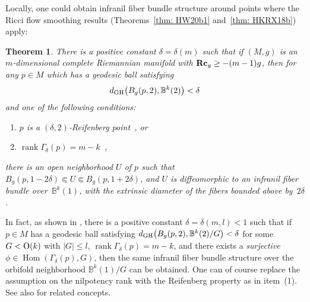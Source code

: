 \documentclass[pdftex]{sigma}
\numberwithin{equation}{section}
\newtheorem{Theorem}{Theorem}[section]
\newcommand{\Rc}{\operatorname{\bf Rc}}
\newcommand{\rank}{\operatorname{rank}}
\begin{document}
Locally, one could obtain infranil fiber bundle structure around points where
the Ricci flow smoothing results (Theorems~\ref{thm: HW20b1} and~\ref{thm: HKRX18b}) apply:
\begin{Theorem}\label{thm: local_infranil}
There is a positive constant $\delta=\delta(m)$ such that if $(M,g)$ is an
$m$-dimensional complete Riemannian manifold with $\Rc_g\ge -(m-1)g$, then for
any $p\in M$ which has a geodesic ball satisfying
\begin{align*}
d_{\rm GH}\big(B_g(p,2),\mathbb{B}^k(2)\big) < \delta
\end{align*}
and one of the following
conditions:
\begin{enumerate}\itemsep=0pt
 \item[$1)$] $p$ is a $(\delta,2)$-Reifenberg point~{\rm \cite{HKRX18}}, or
 \item[$2)$] $\rank \Gamma_{\delta}(p)=m-k$~{\rm \cite{HW20b}},
\end{enumerate}
there is an open neighborhood $U$ of $p$ such that $B_g(p,1-2\delta )\Subset
U\Subset B_g(p,1+2\delta)$, and $U$ is diffeomorphic to an infranil fiber
bundle over~$\mathbb{B}^k(1)$, with the extrinsic diameter of the fibers
bounded above by~$2\delta$.
\end{Theorem}
\begin{Remark}\label{rmk: orbifold_fibration}
In fact, as shown in \cite[Theorem~1.4]{HW20b}, there is
a positive constant $\delta=\delta(m,l)<1$ such that if $p\in M$ has a geodesic
ball satisfying $d_{\rm GH}\big(B_g(p,2),\mathbb{B}^k(2)\slash G\big) < \delta$
for some $G<{\rm O}(k)$ with $|G|\le l$, $\rank \Gamma_{\delta}(p)=m-k$, and there
exists a \emph{surjective} $\phi \in \operatorname{Hom}(\Gamma_{\delta}(p), G)$, then the same
infranil fiber bundle structure over the orbifold neighborhood
$\mathbb{B}^k(1) \slash G$ can be obtained. One can of course replace the
assumption on the nilpotency rank with the Reifenberg property as in item~(1).
See also \cite[Section~7]{Fukaya89} for related concepts.
\end{Remark}
\end{document}
